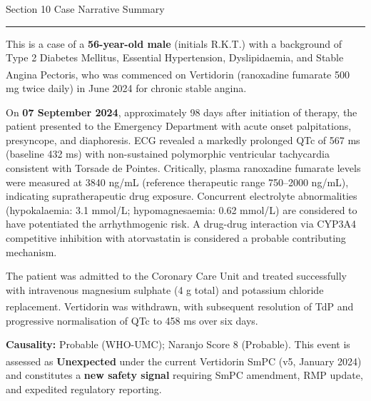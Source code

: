 \documentclass[11pt,a4paper]{scrartcl}
\newcommand{\sectionrule}{%
  \vspace{1pt}%
  {\color{WarmGold}\rule{\linewidth}{1.5pt}}%
  \vspace{4pt}%
}
\begin{document}
\vspace{6mm}

\begin{sectionbox}{\faAlignLeft\quad Section 10 \textbar{} Case Narrative Summary}
\end{sectionbox}
\sectionrule

\begin{tcolorbox}[
  enhanced, arc=2pt, outer arc=2pt,
  colback=white, colframe=LightRule,
  boxrule=0.6pt,
  top=8pt, bottom=8pt, left=10pt, right=10pt,
]
\small\setlength{\parskip}{5pt}

This is a case of a \textbf{56-year-old male} (initials R.K.T.) with a background of Type 2 Diabetes Mellitus, Essential Hypertension, Dyslipidaemia, and Stable Angina Pectoris, who was commenced on Vertidorin\textsuperscript{\textregistered} (ranoxadine fumarate 500 mg twice daily) in June 2024 for chronic stable angina.

On \textbf{07 September 2024}, approximately 98 days after initiation of therapy, the patient presented to the Emergency Department with acute onset palpitations, presyncope, and diaphoresis. ECG revealed a markedly prolonged QTc of 567 ms (baseline 432 ms) with non-sustained polymorphic ventricular tachycardia consistent with Torsade de Pointes. Critically, plasma ranoxadine fumarate levels were measured at 3840 ng/mL (reference therapeutic range 750--2000 ng/mL), indicating supratherapeutic drug exposure. Concurrent electrolyte abnormalities (hypokalaemia: 3.1 mmol/L; hypomagnesaemia: 0.62 mmol/L) are considered to have potentiated the arrhythmogenic risk. A drug-drug interaction via CYP3A4 competitive inhibition with atorvastatin is considered a probable contributing mechanism.

The patient was admitted to the Coronary Care Unit and treated successfully with intravenous magnesium sulphate (4 g total) and potassium chloride replacement. Vertidorin\textsuperscript{\textregistered} was withdrawn, with subsequent resolution of TdP and progressive normalisation of QTc to 458 ms over six days.

\textbf{Causality:} Probable (WHO-UMC); Naranjo Score 8 (Probable). This event is assessed as \textbf{Unexpected} under the current Vertidorin\textsuperscript{\textregistered} SmPC (v5, January 2024) and constitutes a \textbf{new safety signal} requiring SmPC amendment, RMP update, and expedited regulatory reporting.
\end{tcolorbox}
\end{document}
